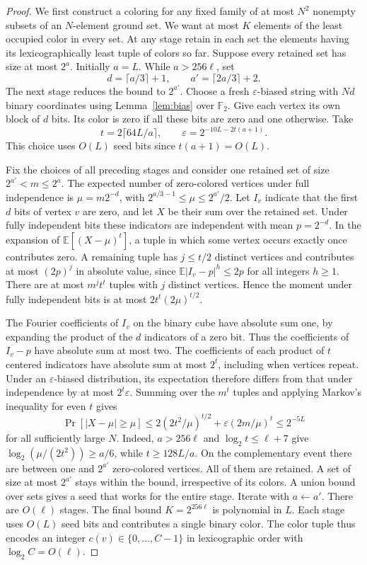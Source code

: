 \documentclass[11pt]{article}
\begin{document}
\begin{proof}
We first construct a coloring for any fixed family of at most $N^2$
nonempty subsets of an $N$-element ground set. We want at most $K$
elements of the least occupied color in every set. At any stage retain
in each set the elements having its lexicographically least tuple of
colors so far. Suppose every retained set has size at most $2^a$.
Initially $a=L$. While $a>256\ell$, set
\[
           d=\lceil a/3\rceil+1,\qquad a'=\lceil 2a/3\rceil+2 .
\]
The next stage reduces the bound to $2^{a'}$. Choose a fresh
$\varepsilon$-biased string with $Nd$ binary coordinates using
Lemma~\ref{lem:bias} over $\mathbb F_2$. Give each vertex its own
block of $d$ bits. Its color is zero if all these bits are zero and
one otherwise. Take
\[
 t=2\lceil 64L/a\rceil,\qquad
 \varepsilon=2^{-10L-2t(a+1)}.
\]
This choice uses $O(L)$ seed bits since $t(a+1)=O(L)$.

Fix the choices of all preceding stages and consider one retained set
of size $2^{a'}<m\le2^a$. The expected number of zero-colored
vertices under full independence is $\mu=m2^{-d}$, with
$2^{a/3-1}\le\mu\le 2^{a'}/2$. Let $I_v$ indicate
that the first $d$ bits of vertex $v$ are zero, and let $X$ be their sum
over the retained set. Under fully independent bits these indicators
are independent with mean $p=2^{-d}$. In the expansion of
$\mathbb E[(X-\mu)^t]$, a tuple in which some vertex occurs exactly
once contributes zero. A remaining tuple has $j\le t/2$ distinct
vertices and contributes at most $(2p)^j$ in absolute value, since
$\mathbb E|I_v-p|^h\le 2p$ for all integers $h\ge 1$. There are at
most $m^j t^t$ tuples with $j$ distinct vertices. Hence the moment
under fully independent bits is at most
$2t^t(2\mu)^{t/2}$.

The Fourier coefficients of $I_v$ on the binary cube have absolute
sum one, by expanding the product of the $d$ indicators of a zero bit.
Thus the coefficients of $I_v-p$ have absolute sum at most two.
The coefficients of each product of $t$ centered indicators have
absolute sum at most $2^t$, including when vertices repeat. Under an
$\varepsilon$-biased distribution, its expectation therefore differs
from that under independence by at most $2^t\varepsilon$. Summing over
the $m^t$ tuples and applying Markov's inequality for even $t$ gives
\[
 \Pr[|X-\mu|\ge\mu]
 \le 2(2t^2/\mu)^{t/2}
      +\varepsilon(2m/\mu)^t
 \le 2^{-5L}
\]
for all sufficiently large $N$. Indeed, $a>256\ell$ and
$\log_2 t\le \ell+7$ give
$\log_2(\mu/(2t^2))\ge a/6$, while $t\ge128L/a$.
On the complementary event there are between one and $2^{a'}$
zero-colored vertices. All of them are retained. A set of size at most
$2^{a'}$ stays within the bound, irrespective of its colors. A union
bound over sets gives a seed that works for the entire stage.
Iterate with $a\gets a'$. There are $O(\ell)$ stages. The final bound
$K=2^{256\ell}$ is polynomial in $L$. Each stage uses $O(L)$ seed
bits and contributes a single binary color. The color tuple thus
encodes an integer $c(v)\in\{0,\ldots,C-1\}$ in lexicographic order
with $\log_2 C=O(\ell)$.


\end{proof}
\end{document}
